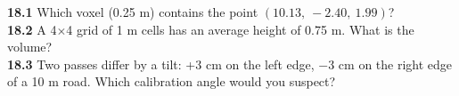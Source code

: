 \begin{tryit}
\textbf{18.1} Which voxel (0.25 m) contains the point $(10.13,\ -2.40,\ 1.99)$?\\
\textbf{18.2} A 4$\times$4 grid of 1 m cells has an average height of 0.75 m. What is the volume?\\
\textbf{18.3} Two passes differ by a tilt: +3 cm on the left edge, $-$3 cm on the right edge of a 10 m road. Which calibration angle would you suspect?
\end{tryit}


